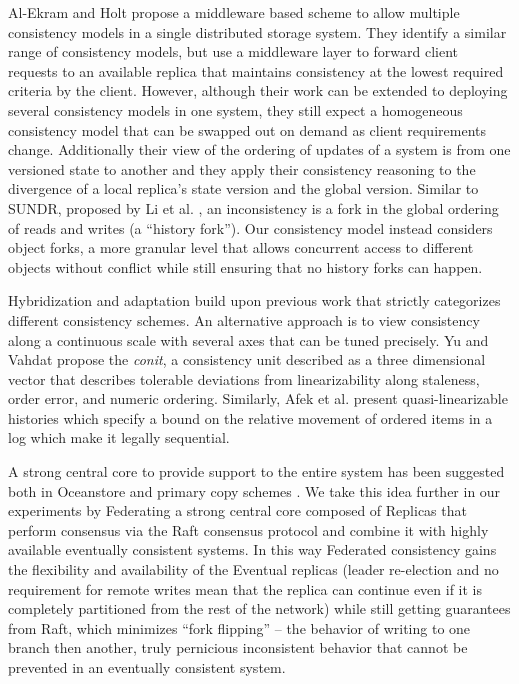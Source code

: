 \documentclass[10pt,conference,letterpaper]{IEEEtran}
\begin{document}
Al-Ekram and Holt \cite{al-ekram_multi-consistency_2010} propose a middleware
based scheme to allow multiple consistency models in a single distributed
storage system.
They identify a similar range of consistency models, but use a middleware
layer to forward client requests to an available replica that maintains
consistency at the lowest required criteria by the client.
However, although their work can be extended to deploying several consistency
models in one system, they still expect a homogeneous consistency model that
can be swapped out on demand as client requirements change.
Additionally their view of the ordering of updates of a system is from one
versioned state to another and they apply their consistency reasoning to the
divergence of a local replica's state version and the global version.
Similar to SUNDR, proposed by Li et al.
\cite{li_secure_2004}, an inconsistency is a fork in the global ordering of
reads and writes (a ``history fork'').
Our consistency model instead considers object forks, a more granular level
that allows concurrent access to different objects without conflict while
still ensuring that no history forks can happen.

\balance

Hybridization and adaptation build upon previous work that strictly
categorizes different consistency schemes.
An alternative approach is to view consistency along a continuous scale with
several axes that can be tuned precisely.
Yu and Vahdat \cite{yu_design_2002} propose the \textit{conit}, a consistency
unit described as a three dimensional vector that describes tolerable
deviations from linearizability along staleness, order error, and numeric
ordering.
Similarly, Afek et al.
\cite{afek_quasi-linearizability:_2010} present quasi-linearizable histories
which specify a bound on the relative movement of ordered items in a log which
make it legally sequential.

A strong central core to provide support to the entire system has been
suggested both in Oceanstore \cite{kubiatowicz_oceanstore:_2000} and primary
copy schemes \cite{gray_dangers_1996}.
We take this idea further in our experiments by Federating a strong central
core composed of Replicas that perform consensus via the Raft consensus
protocol and combine it with highly available eventually consistent systems.
In this way Federated consistency gains the flexibility and availability of
the Eventual replicas (leader re-election and no requirement for remote writes
mean that the replica can continue even if it is completely partitioned from
the rest of the network) while still getting guarantees from Raft, which
minimizes ``fork flipping'' -- the behavior of writing to one branch then
another, truly pernicious inconsistent behavior that cannot be prevented in an
eventually consistent system.
\end{document}
